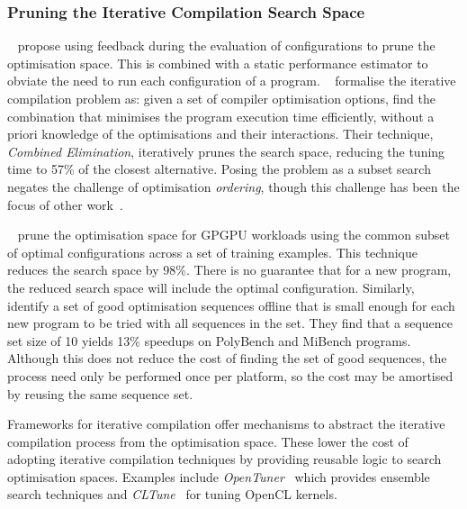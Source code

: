 \subsubsection{Pruning the Iterative Compilation Search Space}

\citeauthor{Triantafyllis2003}~\cite{Triantafyllis2003} propose using feedback during the evaluation of configurations to prune the optimisation space. This is combined with a static performance estimator to obviate the need to run each configuration of a program. \citeauthor{Pan2006}~\cite{Pan2006} formalise the iterative compilation problem as: given a set of compiler optimisation options, find the combination that minimises the program execution time efficiently, without a priori knowledge of the optimisations and their interactions. Their technique, \emph{Combined Elimination}, iteratively prunes the search space, reducing the tuning time to 57\% of the closest alternative. Posing the problem as a subset search negates the challenge of optimisation \emph{ordering}, though this challenge has been the focus of other work~\cite{Kulkarni2012,Purini2013}.

\citeauthor{Ryoo2008}~\cite{Ryoo2008} prune the optimisation space for GPGPU workloads using the common subset of optimal configurations across a set of training examples. This technique reduces the search space by 98\%. There is no guarantee that for a new program, the reduced search space will include the optimal configuration.
Similarly, \citeauthor{Purini2013}~\cite{Purini2013} identify a set of good optimisation sequences offline that is small enough for each new program to be tried with all sequences in the set. They find that a sequence set size of 10 yields 13\% speedups on PolyBench and MiBench programs. Although this does not reduce the cost of finding the set of good sequences, the process need only be performed once per platform, so the cost may be amortised by reusing the same sequence set.

Frameworks for iterative compilation offer mechanisms to abstract the iterative compilation process from the optimisation space. These lower the cost of adopting iterative compilation techniques by providing reusable logic to search optimisation spaces. Examples include \emph{OpenTuner}~\cite{Ansel2013} which provides ensemble search techniques and \emph{CLTune}~\cite{Nugteren2015} for tuning OpenCL kernels.

